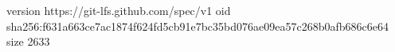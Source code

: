 version https://git-lfs.github.com/spec/v1
oid sha256:f631a663ce7ac1874f624fd5cb91e7bc35bd076ae09ea57c268b0afb686c6e64
size 2633
